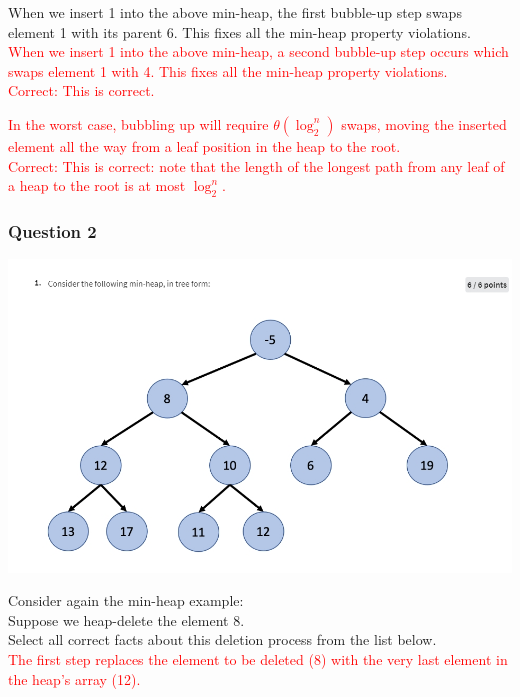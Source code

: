 \documentclass{article}
\begin{document}
When we insert 1 into the above min-heap, the first bubble-up step swaps element 1 with its parent 6.  This fixes all the min-heap property violations.\\

\textcolor{red}{When we insert 1 into the above min-heap, a second bubble-up step occurs which swaps element 1 with 4.  This fixes all the min-heap property violations.\\
Correct: This is correct.\\}

\textcolor{red}{In the worst case, bubbling up will require $\theta(\log_2^n)$ swaps, moving the inserted element all the way from a leaf position in the heap to the root.\\
Correct: This is correct: note that the length of the longest path from any leaf of a heap to the root is  at most $\log_2^n$.\\}


\subsubsection{Question 2}


\includegraphics[width=\textwidth]{heapsortquestion1chart.png}



Consider again the min-heap example:\\
Suppose we heap-delete the element 8.\\

Select all correct facts about this deletion process from the list below.\\

\textcolor{red}{The first step replaces the element to be deleted (8) with the very last element in the heap's array (12).\\}
\end{document}
